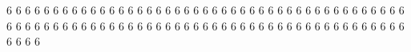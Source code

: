  6
 6
 6
 6
 6
 6
 6
 6
 6
 6
 6
 6
 6
 6
 6
 6
 6
 6
 6
 6
 6
 6
 6
 6
 6
 6
 6
 6
 6
 6
 6
 6
 6
 6
 6
 6
 6
 6
 6
 6
 6
 6
 6
 6
 6
 6
 6
 6
 6
 6
 6
 6
 6
 6
 6
 6
 6
 6
 6
 6
 6
 6
 6
 6
 6
 6
 6
 6
 6
 6
 6
 6
 6
 6
 6
 6
 6
 6
 6
 6
 6
 6
 6
 6
 6
 6
 6
 6
 6
 6
